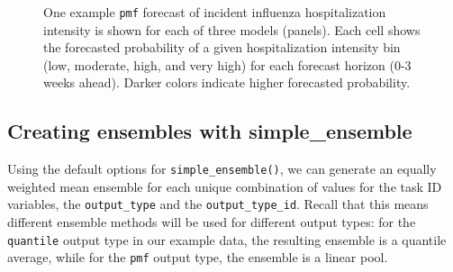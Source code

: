 \documentclass[
  article,
  shortnames,
  notitle]{jss}
\begin{document}
\begin{longtable}[]
\caption{\label{tbl-example-forecasts-pmf}Example \texttt{pmf} model
output for forecasts of incident influenza hospitalization intensity. A
subset of example model output is shown: 1-week ahead pmf forecasts made
on 2022-12-17 for Massachusetts from three distinct models. We round the
forecasted probability (in the \texttt{value} column) to two digits. The
\texttt{location}, \texttt{reference\_date} and
\texttt{target\_end\_date} columns have been omitted for brevity. This
example data is provided in the  package.}

\tabularnewline
\end{longtable}

\begin{figure}


\caption{\label{fig-plot-ex-mods-pmf}One example \texttt{pmf} forecast
of incident influenza hospitalization intensity is shown for each of
three models (panels). Each cell shows the forecasted probability of a
given hospitalization intensity bin (low, moderate, high, and very high)
for each forecast horizon (0-3 weeks ahead). Darker colors indicate
higher forecasted probability.}

\end{figure}%

\subsection{Creating ensembles with
simple\_ensemble}\label{creating-ensembles-with-simple_ensemble}

Using the default options for \texttt{simple\_ensemble()}, we can
generate an equally weighted mean ensemble for each unique combination
of values for the task ID variables, the \texttt{output\_type} and the
\texttt{output\_type\_id}. Recall that this means different ensemble
methods will be used for different output types: for the
\texttt{quantile} output type in our example data, the resulting
ensemble is a quantile average, while for the \texttt{pmf} output type,
the ensemble is a linear pool.
\end{document}
